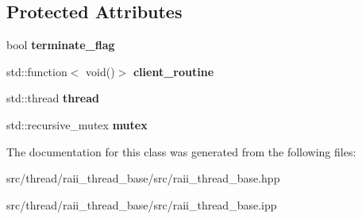 \subsection*{Protected Attributes}
\begin{DoxyCompactItemize}
\item 
\hypertarget{classxstd_1_1raii__thread__base_aaac3bfb5572d71de17cb71d7ed0bb15c}{bool {\bfseries terminate\-\_\-flag}}\label{classxstd_1_1raii__thread__base_aaac3bfb5572d71de17cb71d7ed0bb15c}

\item 
\hypertarget{classxstd_1_1raii__thread__base_a6b3e160c7eb131008410a16c460b03ff}{std\-::function$<$ void()$>$ {\bfseries client\-\_\-routine}}\label{classxstd_1_1raii__thread__base_a6b3e160c7eb131008410a16c460b03ff}

\item 
\hypertarget{classxstd_1_1raii__thread__base_a664b3c47514557c3047e4ee0d7d9f25f}{std\-::thread {\bfseries thread}}\label{classxstd_1_1raii__thread__base_a664b3c47514557c3047e4ee0d7d9f25f}

\item 
\hypertarget{classxstd_1_1raii__thread__base_a9d9e01fced1a4f58ea5a9cc165f54fe3}{std\-::recursive\-\_\-mutex {\bfseries mutex}}\label{classxstd_1_1raii__thread__base_a9d9e01fced1a4f58ea5a9cc165f54fe3}

\end{DoxyCompactItemize}


The documentation for this class was generated from the following files\-:\begin{DoxyCompactItemize}
\item 
src/thread/raii\-\_\-thread\-\_\-base/src/raii\-\_\-thread\-\_\-base.\-hpp\item 
src/thread/raii\-\_\-thread\-\_\-base/src/raii\-\_\-thread\-\_\-base.\-ipp\end{DoxyCompactItemize}
